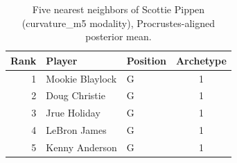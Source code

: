\begin{table}[htbp]
  \centering\small
  \begin{tabular}{rllc}
    \toprule
    Rank & Player & Position & Archetype \\
    \midrule
    1 & Mookie Blaylock & G & 1 \\
    2 & Doug Christie & G & 1 \\
    3 & Jrue Holiday & G & 1 \\
    4 & LeBron James & G & 1 \\
    5 & Kenny Anderson & G & 1 \\
    \bottomrule
  \end{tabular}
  \caption{Five nearest neighbors of Scottie Pippen (curvature_m5 modality), Procrustes-aligned posterior mean.}
  \label{tab:Scottie_Pippen_neighbors_curvature_m5}
\end{table}

